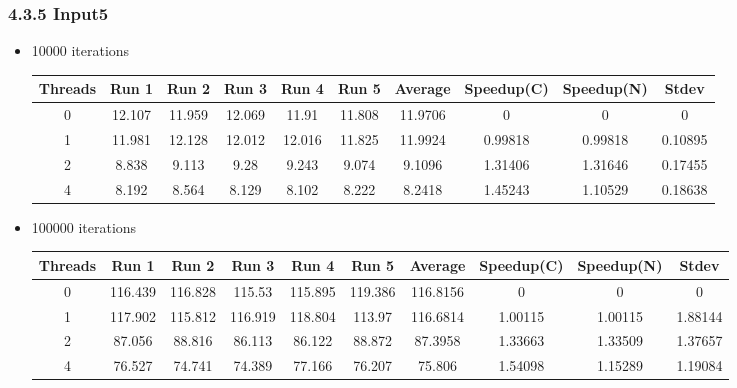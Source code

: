 \subsubsection*{4.3.5 Input5} 
 \begin{itemize}
\item 10000 iterations
\begin{center}
 \begin{adjustbox}{width=\columnwidth, center} 
 \begin{tabular}{ | |c | c c c c c | c | c c | c | |} \hline 
 Threads & Run 1 & Run 2 & Run 3 & Run 4 & Run 5 & Average & Speedup(C) & Speedup(N) & Stdev \\ [0.5ex] 
 \hline 
 \hline 
0& 12.107 & 11.959 & 12.069 & 11.91 & 11.808 & 11.9706 & 0 & 0 & 0\\ 
 \hline
1& 11.981 & 12.128 & 12.012 & 12.016 & 11.825 & 11.9924 & 0.99818 & 0.99818 & 0.10895\\ 
 \hline
2& 8.838 & 9.113 & 9.28 & 9.243 & 9.074 & 9.1096 & 1.31406 & 1.31646 & 0.17455\\ 
 \hline
4& 8.192 & 8.564 & 8.129 & 8.102 & 8.222 & 8.2418 & 1.45243 & 1.10529 & 0.18638\\ 
 \hline
\end{tabular} 
 \end{adjustbox} 
 \end{center} 
\item 100000 iterations
\begin{center}
 \begin{adjustbox}{width=\columnwidth, center} 
 \begin{tabular}{ | |c | c c c c c | c | c c | c | |} \hline 
 Threads & Run 1 & Run 2 & Run 3 & Run 4 & Run 5 & Average & Speedup(C) & Speedup(N) & Stdev \\ [0.5ex] 
 \hline 
 \hline 
0& 116.439 & 116.828 & 115.53 & 115.895 & 119.386 & 116.8156 & 0 & 0 & 0\\ 
 \hline
1& 117.902 & 115.812 & 116.919 & 118.804 & 113.97 & 116.6814 & 1.00115 & 1.00115 & 1.88144\\ 
 \hline
2& 87.056 & 88.816 & 86.113 & 86.122 & 88.872 & 87.3958 & 1.33663 & 1.33509 & 1.37657\\ 
 \hline
4& 76.527 & 74.741 & 74.389 & 77.166 & 76.207 & 75.806 & 1.54098 & 1.15289 & 1.19084\\ 
 \hline
\end{tabular} 
 \end{adjustbox} 
 \end{center} 
\end{itemize}
